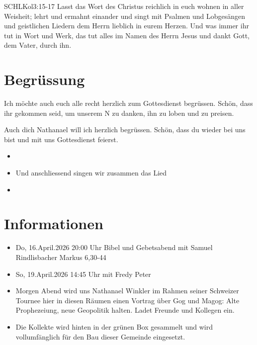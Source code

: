 \documentclass[fontsize=14pt]{../../inc/mybib}
\newcommand{\Name}{Nathanael}
\begin{document}
\begin{bibelbox}{SCHL}{Kol}{3:15-17}
    Lasst das Wort des Christus reichlich in euch wohnen in aller Weisheit; lehrt und ermahnt einander und singt mit Psalmen und Lobgesängen und geistlichen Liedern dem Herrn lieblich in eurem Herzen. Und was immer ihr tut in Wort und Werk, das tut alles im Namen des Herrn Jesus und dankt Gott, dem Vater, durch ihn.
\end{bibelbox}
\section{Begrüssung}
Ich möchte auch euch alle recht herzlich zum Gottesdienst begrüssen. Schön, dass ihr gekommen seid, um unserem \herr N zu danken, ihn zu loben und zu preisen.

Auch dich \Name{} will ich herzlich begrüssen. Schön, dass du wieder bei uns bist und mit uns Gottesdienst feierst.
\begin{itemize}
    \item[] 
    \item[] Und anschliessend singen wir zusammen das Lied
    \item[] 
\end{itemize}

\section{Informationen}
\begin{itemize}
    \item {} Do, 16.April.2026 20:00 Uhr Bibel und Gebetsabend mit Samuel Rindlisbacher Markus 6,30-44
    \item {} So, 19.April.2026 14:45 Uhr mit Fredy Peter    
    \item {} Morgen Abend wird uns Nathanael Winkler im Rahmen seiner Schweizer Tournee hier in diesen Räumen einen Vortrag über Gog und Magog: \flqq{} Alte Prophezeiung, neue Geopolitik\frqq{} halten. Ladet Freunde und Kollegen ein.
    \item {} Die Kollekte wird hinten in der grünen Box gesammelt und wird vollumfänglich für den Bau dieser Gemeinde eingesetzt.
\end{itemize}
\end{document}
